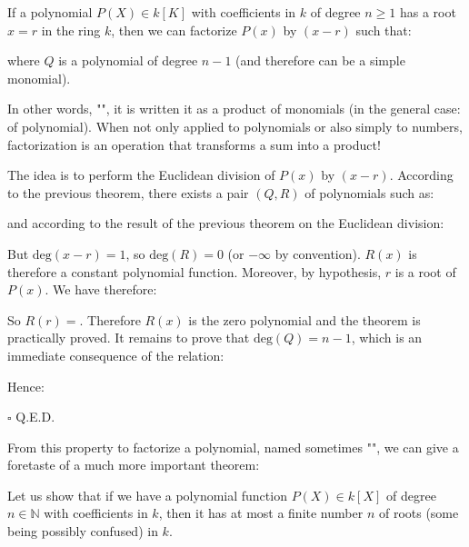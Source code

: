	
	\begin{theorem}
	If a polynomial $P(X)\in k[K]$ with coefficients in $k$ of degree $n\geq 1$ has a root $x=r$ in the ring $k$, then we can factorize $P(x)$ by $(x - r)$ such that:
	
	where $Q$ is a polynomial of degree $n-1$ (and therefore can be a simple monomial).
	
	In other words, "", it is written it as a product of monomials (in the general case: of polynomial). When not only applied to polynomials or also simply to numbers, factorization is an operation that transforms a sum into a product!
	\end{theorem}
	\begin{dem}
	The idea is to perform the Euclidean division of $P(x)$ by $(x-r)$. According to the previous theorem, there exists a pair $(Q, R)$ of polynomials such as:
	
and according to the result of the previous theorem on the Euclidean division:
	
	But $\text{deg}(x-r)=1$, so $\text{deg}(R)=0$ (or $-\infty$ by convention). $R(x)$ is therefore a constant polynomial function. Moreover, by hypothesis, $r$ is a root of $P(x)$. We have therefore:
	
	So $R(r)=$. Therefore $R(x)$ is the zero polynomial and the theorem is practically proved. It remains to prove that $\text{deg}(Q)=n-1$, which is an immediate consequence of the relation:
	
	Hence:
	
	\begin{flushright}
		$\square$  Q.E.D.
	\end{flushright}
	\end{dem}
	From this property to factorize a polynomial, named sometimes "", we can give a foretaste of a much more important theorem:
	\begin{theorem}
	Let us show that if we have a polynomial  function $P(X)\in k[X]$ of degree $n\in \mathbb{N}$ with coefficients in $k$, then it has at most a finite number $n$ of roots (some being possibly confused) in $k$.
	\end{theorem}

